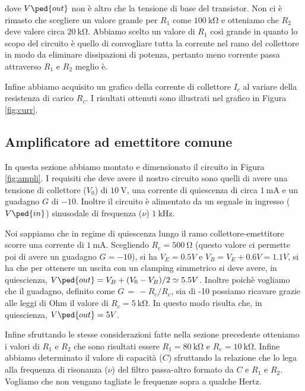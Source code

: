 dove $V\ped{out}$ non è altro che la tensione di base del transistor.
Non ci è rimasto che scegliere un valore grande per $R_1$ come $\SI{100}{\kilo\ohm}$ e otteniamo che $R_2$ deve valere circa $\SI{20}{\kilo\ohm}$. Abbiamo scelto un valore di $R_1$ così grande in quanto lo scopo del circuito è quello di convogliare tutta la corrente nel ramo del collettore in modo da eliminare dissipazioni di potenza, pertanto meno corrente passa attraverso $R_1$ e $R_2$ meglio è.

Infine abbiamo acquisito un grafico della corrente di collettore $I_c$ al variare della resistenza di carico $R_c$. I risultati ottenuti sono illustrati nel grafico in Figura \ref{fig:curr}.

\subsection*{Amplificatore ad emettitore comune}

In questa sezione abbiamo montato e dimensionato il circuito in Figura \ref{fig:ampli}. I requisiti che deve avere il nostro circuito sono quelli di avere una tensione di collettore ($V_0$) di $\SI{10}{\volt}$, una corrente di quiescenza di circa $\SI{1}{\milli\ampere}$ e un guadagno $G$ di $-10$. Inoltre il circuito è alimentato da un segnale in ingresso ($V\ped{in}$) sinusodale di frequenza ($\nu$) $\SI{1}{\kilo\hertz}$.

Noi sappiamo che in regime di quiescenza lungo il ramo collettore-emettitore scorre una corrente di $\SI{1}{\milli\ampere}$. Scegliendo $R_e = \SI{500}{\ohm}$ (questo valore ci permette poi di avere un guadagno $G = -10$), si ha $V_E = 0.5 V$ e $V_B = V_E + 0.6 V  = 1.1 V$, si ha che per ottenere un uscita con un clamping simmetrico si deve avere, in quiescienza, $V\ped{out} = V_B + (V_0 - V_B)/2 \simeq 5.5 V$. Inoltre poichè vogliamo che il guadagno, definito come $G\,=\,-R_c/R_e$, sia di -10 possiamo ricavare grazie alle leggi di Ohm il valore di $R_c = \SI{5}{\kilo\ohm}$. In questo modo risulta che, in quiescienza, $V\ped{out} = 5 V$.

Infine sfruttando le stesse considerazioni fatte nella sezione precedente otteniamo i valori di $R_1$ e $R_2$ che sono risultati essere $R_1=\SI{80}{\kilo\ohm}$ e $R_e=\SI{10}{\kilo\ohm}$.
Infine abbiamo determinato il valore di capacità ($C$) sfruttando la relazione che lo lega alla frequenza di risonanza ($\nu$) del filtro passa-altro formato da $C$ e $R_1$ e $R_2$. Vogliamo che non vengano tagliate le frequenze sopra a qualche Hertz.

